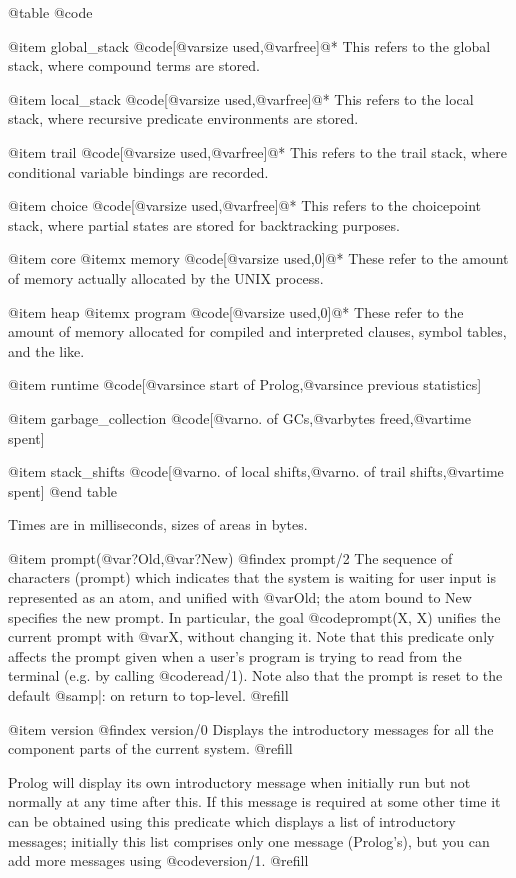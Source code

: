 @table @code

@item global_stack
@code{[@var{size used},@var{free}]}@*
This refers to the global stack, where compound terms are stored.

@item local_stack
@code{[@var{size used},@var{free}]}@* 
This refers to the local stack, where recursive predicate environments
are stored.

@item trail
@code{[@var{size used},@var{free}]}@*
This refers to the trail stack, where conditional variable bindings are
recorded.

@item choice
@code{[@var{size used},@var{free}]}@*
This refers to the choicepoint stack, where partial states are stored
for backtracking purposes.

@item core
@itemx memory
@code{[@var{size used},0]}@*
These refer to the amount of memory actually allocated by the UNIX
process.

@item heap
@itemx program
@code{[@var{size used},0]}@*
These refer to the amount of memory allocated for compiled and
interpreted clauses, symbol tables, and the like.

@item runtime
@code{[@var{since start of Prolog},@var{since previous statistics}]}

@item garbage_collection
@code{[@var{no. of GCs},@var{bytes freed},@var{time spent}]}

@item stack_shifts
@code{[@var{no. of local shifts},@var{no. of trail shifts},@var{time spent}]}
@end table

Times are in milliseconds, sizes of areas in bytes.

@item prompt(@var{?Old},@var{?New})
@findex prompt/2
The sequence of characters (prompt) which indicates that the system is
waiting for user input is represented as an atom, and unified with
@var{Old}; the atom bound to New specifies the new prompt.  In
particular, the goal @code{prompt(X, X)} unifies the current prompt with
@var{X}, without changing it.  Note that this predicate only affects the
prompt given when a user's program is trying to read from the terminal
(e.g. by calling @code{read/1}).  Note also that the prompt is reset to
the default @samp{|: } on return to top-level. @refill

@item version
@findex version/0
Displays the introductory messages for all the component parts of the
current system. @refill

Prolog will display its own introductory message when initially run but not
normally at any time after this.  If this message is required at some other
time it can be obtained using this predicate which displays a list of
introductory messages; initially this list comprises only one message
(Prolog's), but you can add more messages using @code{version/1}. @refill

